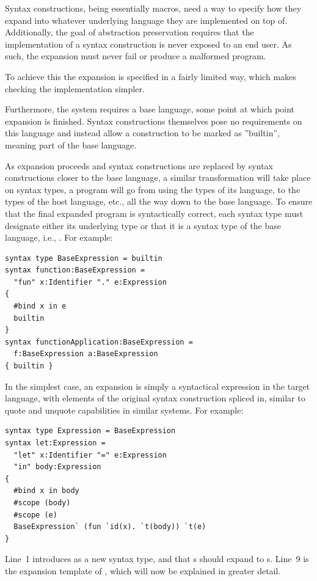 \documentclass{kththesis}
\begin{document}
Syntax constructions, being essentially macros, need a way to specify how they expand into whatever underlying language they are implemented on top of. Additionally, the goal of abstraction preservation requires that the implementation of a syntax construction is never exposed to an end user. As such, the expansion must never fail or produce a malformed program.

To achieve this the expansion is specified in a fairly limited way, which makes checking the implementation simpler.

Furthermore, the system requires a base language, some point at which point expansion is finished. Syntax constructions themselves pose no requirements on this language and instead allow a construction to be marked as ''builtin'', meaning part of the base language.

As expansion proceeds and syntax constructions are replaced by syntax constructions closer to the base language, a similar transformation will take place on syntax types, a program will go from using the types of its language, to the types of the host language, etc., all the way down to the base language. To ensure that the final expanded program is syntactically correct, each syntax type must designate either its underlying type or that it is a syntax type of the base language, i.e., . For example:

\begin{verbatim}
syntax type BaseExpression = builtin
syntax function:BaseExpression =
  "fun" x:Identifier "." e:Expression
{
  #bind x in e
  builtin
}
syntax functionApplication:BaseExpression =
  f:BaseExpression a:BaseExpression
{ builtin }
\end{verbatim}

In the simplest case, an expansion is simply a syntactical expression in the target language, with elements of the original syntax construction spliced in, similar to quote and unquote capabilities in similar systems. For example:

\begin{verbatim}
syntax type Expression = BaseExpression
syntax let:Expression =
  "let" x:Identifier "=" e:Expression
  "in" body:Expression
{
  #bind x in body
  #scope (body)
  #scope (e)
  BaseExpression` (fun `id(x). `t(body)) `t(e)
}
\end{verbatim}

Line~1 introduces  as a new syntax type, and that s should expand to s. Line~9 is the expansion template of , which will now be explained in greater detail.
\end{document}
